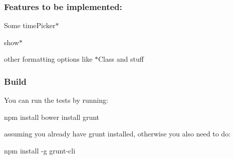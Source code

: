 \subsubsection*{Features to be implemented\+:}


\begin{DoxyItemize}
\item Some {\ttfamily time\+Picker$\ast$}
\item {\ttfamily show$\ast$}
\item other formatting options like {\ttfamily $\ast$\+Class} and stuff
\end{DoxyItemize}

\subsubsection*{Build}

You can run the tests by running\+: 
\begin{DoxyCode}
npm install
bower install
grunt
\end{DoxyCode}


assuming you already have {\ttfamily grunt} installed, otherwise you also need to do\+: 
\begin{DoxyCode}
npm install -g grunt-cli
\end{DoxyCode}


\href{https://bitdeli.com/free}{\tt } 